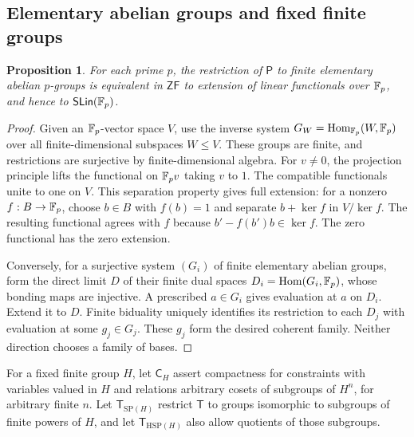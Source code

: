 \documentclass[11pt,a4paper]{article}
\newtheorem{proposition}[theorem]{Proposition}
\theoremstyle{definition}\newtheorem{definition}[theorem]{Definition}
\theoremstyle{remark}\newtheorem{remark}[theorem]{Remark}
\newcommand{\ZF}{\mathsf{ZF}}\newcommand{\ZFA}{\mathsf{ZFA}}
\begin{document}
\subsection{Elementary abelian groups and fixed finite groups}\label{sec:restrictedgroups}

\begin{proposition}\label{prop:elementary-projection}
For each prime $p$, the restriction of $\mathsf P$ to finite elementary abelian $p$-groups is equivalent in $\ZF$ to extension of linear functionals over $\mathbb F_p$, and hence to $\mathsf{SLin}(\mathbb F_p)$.
\end{proposition}
\begin{proof}
Given an $\mathbb F_p$-vector space $V$, use the inverse system $G_W=\operatorname{Hom}_{\mathbb F_p}(W,\mathbb F_p)$ over all finite-dimensional subspaces $W\leq V$. These groups are finite, and restrictions are surjective by finite-dimensional algebra. For $v\ne0$, the projection principle lifts the functional on $\mathbb F_pv$ taking $v$ to $1$. The compatible functionals unite to one on $V$. This separation property gives full extension: for a nonzero $f:B\to\mathbb F_p$, choose $b\in B$ with $f(b)=1$ and separate $b+\ker f$ in $V/\ker f$. The resulting functional agrees with $f$ because $b'-f(b')b\in\ker f$. The zero functional has the zero extension.

Conversely, for a surjective system $(G_i)$ of finite elementary abelian groups, form the direct limit $D$ of their finite dual spaces $D_i=\operatorname{Hom}(G_i,\mathbb F_p)$, whose bonding maps are injective. A prescribed $a\in G_i$ gives evaluation at $a$ on $D_i$. Extend it to $D$. Finite biduality uniquely identifies its restriction to each $D_j$ with evaluation at some $g_j\in G_j$. These $g_j$ form the desired coherent family. Neither direction chooses a family of bases.
\end{proof}

For a fixed finite group $H$, let $\mathsf C_H$ assert compactness for constraints with variables valued in $H$ and relations arbitrary cosets of subgroups of $H^n$, for arbitrary finite $n$. Let $\mathsf T_{\mathrm{SP}(H)}$ restrict $\mathsf T$ to groups isomorphic to subgroups of finite powers of $H$, and let $\mathsf T_{\mathrm{HSP}(H)}$ also allow quotients of those subgroups.
\end{document}
